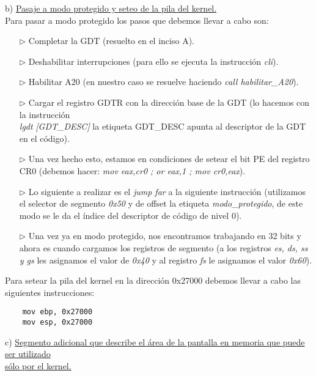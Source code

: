 \documentclass[a4paper]{article}
\begin{document}
{\large b)} \underline{Pasaje a modo protegido y seteo de la pila del kernel.}\\

Para pasar a modo protegido los pasos que debemos llevar a cabo son:


\begin{itemize}
\item[$\triangleright$] Completar la GDT (resuelto en el inciso A).
\item[$\triangleright$] Deshabilitar interrupciones (para ello se ejecuta la instrucci\'on \emph{cli}).
\item[$\triangleright$] Habilitar A20 (en nuestro caso se resuelve haciendo \emph{call habilitar_A20}).
\item[$\triangleright$] Cargar el registro GDTR con la direcci\'on base de la GDT (lo hacemos con la instrucci\'on  \\ \emph{lgdt} \emph{ [GDT_DESC]} la etiqueta GDT_DESC apunta al descriptor de la GDT en el c\'odigo).
\item[$\triangleright$] Una vez hecho esto, estamos en condiciones de setear el bit PE del registro CR0 (debemos hacer: \emph{mov eax,cr0 ; or eax,1 ; mov cr0,eax}).
\item[$\triangleright$] Lo siguiente a realizar es el \emph{jump far} a la siguiente instrucci\'on (utilizamos el selector de segmento \emph{0x50} y de offset la etiqueta \emph{modo_protegido}, de este modo se le da el índice del descriptor de código de nivel 0).
\item[$\triangleright$] Una vez ya en modo protegido, nos encontramos trabajando en 32 bits y ahora es cuando cargamos los registros de segmento (a los registros  \emph{es, ds, ss y gs} les asignamos el valor de \emph{0x40} y al registro \emph{fs} le asignamos el valor \emph{0x60}).
\end{itemize}
 \bigskip	
Para setear la pila del kernel en la direcci\'on 0x27000 debemos llevar a cabo las siguientes instrucciones: 
\begin{codesnippet}
\begin{verbatim}
    mov ebp, 0x27000
    mov esp, 0x27000
\end{verbatim}
\end{codesnippet}

\newpage

{\large c)} \underline{Segmento adicional que describe el \'area de la pantalla en memoria que puede ser utilizado} \\ \underline{s\'olo por el kernel.}\\
\end{document}
